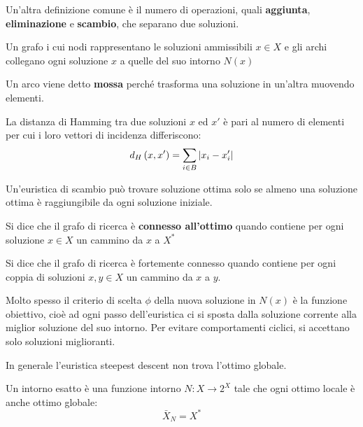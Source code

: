 \documentclass[\main/main.tex]{subfiles}
\begin{document}
\begin{multicols}{2}
\begin{definition}[Intorno]
        Un'altra definizione comune è il numero di operazioni, quali \textbf{aggiunta}, \textbf{eliminazione} e \textbf{scambio}, che separano due soluzioni.
    \end{definition}
    \begin{definition}
        Un grafo i cui nodi rappresentano le soluzioni ammissibili \(x \in X\) e gli archi collegano ogni soluzione \(x\) a quelle del suo intorno \(N(x)\)
        
        Un arco viene detto \textbf{mossa} perché trasforma una soluzione in un'altra muovendo elementi.
    \end{definition}
    \begin{definition}
        La distanza di Hamming tra due soluzioni \(x\) ed \(x'\) è pari al numero di elementi per cui i loro vettori di incidenza differiscono:
        \[
            d_H\left(x, x'\right) = \sum_{i \in B} \left\lvert x_i - x'_i\right\rvert
        \]
    \end{definition}
\begin{observation}
    Un'euristica di scambio può trovare soluzione ottima solo se almeno una soluzione ottima è raggiungibile da ogni soluzione iniziale.
\end{observation}
\begin{definition}
Si dice che il grafo di ricerca è \textbf{connesso all'ottimo} quando contiene per ogni soluzione \(x \in X\) un cammino da \(x\) a \(X^*\)
\end{definition}
\begin{definition}
Si dice che il grafo di ricerca è fortemente connesso quando contiene per ogni coppia di soluzioni \(x, y \in X\) un cammino da \(x\) a \(y\).
\end{definition}
\begin{definition}
    Molto spesso il criterio di scelta \(\phi\) della nuova soluzione in \(N(x)\) è la funzione obiettivo, cioè ad ogni passo dell'euristica ci si sposta dalla soluzione corrente alla miglior soluzione del suo intorno. Per evitare comportamenti ciclici, si accettano solo soluzioni miglioranti.
    
    In generale l'euristica  steepest descent non trova l'ottimo globale.
\end{definition}
\begin{definition}
    Un intorno esatto è una funzione intorno \(N: X \rightarrow 2^X\) tale che ogni ottimo locale è anche ottimo globale:
    \[
        \bar{X}_N = X^*
    \]
    

\end{definition}
\end{multicols}
\end{document}
